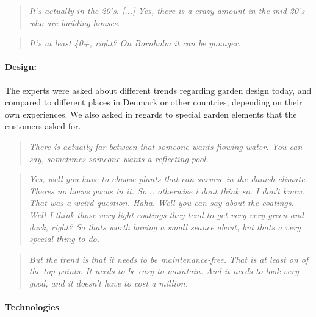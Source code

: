 		\begin{quote}
			\textit{It's actually in the 20's. [...] Yes, there is a crazy amount in the mid-20's who are building houses}\label{quote:expertClients3}.\\
		\end{quote}
		
		\begin{quote}
			\textit{It's at least 40+, right? On Bornholm it can be younger}\label{quote:expertClients4}.\\
		\end{quote}
		

		\paragraph*{Design:}
		The experts were asked about different trends regarding garden design today, and compared to different places in Denmark or other countries, depending on their own experiences. We also asked in regards to special garden elements that the customers asked for.

		
		\begin{quote}
			\textit{There is actually far between that someone wants flowing water. You can say, sometimes someone wants a reflecting pool.}\label{quote:expertDesign1}\\
		\end{quote}
		
		\begin{quote}
			\textit{Yes, well you have to choose plants that can survive in the danish climate. Theres no hocus pocus in it. So... otherwise i dont think so. I don't know. That was a weird question. Haha. Well you can say about the coatings. Well I think those very light coatings they tend to get very very green and dark, right? So thats worth having a small seance about, but thats a very special thing to do.}\label{quote:expertDesign2}\\
		\end{quote}
		
		\begin{quote}
			\textit{But the trend is that it needs to be maintenance-free. That is at least on of the top points. It needs to be easy to maintain. And it needs to look very good, and it doesn't have to cost a million.}\label{quote:expertDesign3}\\
		\end{quote}

		
		
		
		\paragraph*{Technologies}



